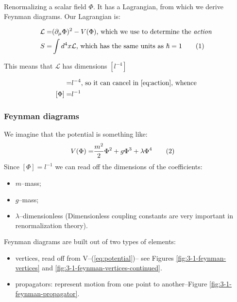 \documentclass[]{article}
\newcommand\numberthis{\addtocounter{equation}{1}\tag{\theequation}}
\begin{document}
Renormalizing a scalar field $\Phi$. It has a Lagrangian, from which we derive Feynman diagrams. Our Lagrangian is:

\begin{align*}
	\mathcal{L} =& (\partial_\mu \Phi)^2 - V(\Phi) \text{, which we use to determine the \emph{action}}\\
	S =& \int d^4 x \mathcal{L} \text{, which has the same units as $\hslash=1$} \numberthis \label{eq:action}
\end{align*}

This means that $\mathcal{L}$ has dimensions $[l^{-4}]$

\begin{align*}
	[(\frac{\partial \Phi}{\partial x})^2]=&l^{-4} \text{, so it can cancel in \eqref{eq:action}, whence}\\
	[\Phi] =& l^{-1}
\end{align*}

\subsubsection{Feynman diagrams}

We imagine that the potential is something like:
\begin{align*}
	V(\Phi) =& \frac{m^2}{2} \Phi^2 + g \Phi^3 + \lambda \Phi^4 \numberthis \label{eq:potential}
\end{align*}
Since $[\Phi] = l^{-1}$ we can read off the dimensions of the coefficients:
\begin{itemize}
	\item $m$--mass;
	\item $g$--mass;
	\item $\lambda$--dimensionless (Dimensionless coupling constants are very important in renormalization theory). 
\end{itemize}

Feynman diagrams are built out of two types of elements:
\begin{itemize}
	\item vertices, read off from V--(\ref{eq:potential})-- see Figures \ref{fig:3-1-feynman-vertices} and \ref{fig:3-1-feynman-vertices-continued}.
	\item propagators: represent motion from one point to another--Figure \ref{fig:3-1-feynman-propagator}.
\end{itemize}
\end{document}
